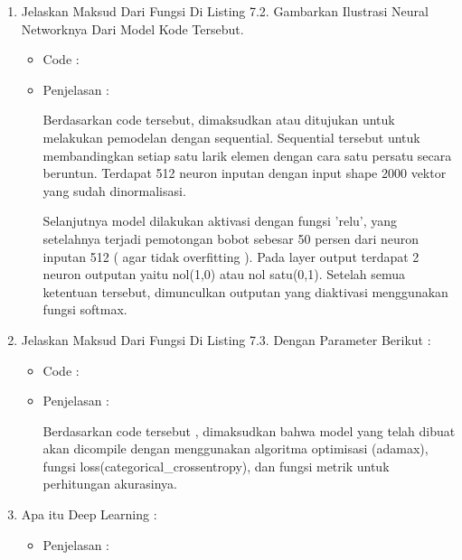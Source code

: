 \begin{enumerate}
\par
\item Jelaskan Maksud Dari Fungsi Di Listing 7.2. Gambarkan Ilustrasi Neural Networknya Dari Model Kode Tersebut.
\begin{itemize}
\item Code :

\item Penjelasan : 
\par Berdasarkan code tersebut, dimaksudkan atau ditujukan untuk melakukan pemodelan dengan sequential. Sequential tersebut untuk membandingkan setiap satu larik elemen dengan cara satu persatu secara beruntun. Terdapat 512 neuron inputan dengan input shape 2000 vektor yang sudah dinormalisasi. 
\par Selanjutnya model dilakukan aktivasi dengan fungsi 'relu', yang setelahnya terjadi pemotongan bobot  sebesar 50 persen dari neuron inputan 512 ( agar tidak overfitting ). Pada layer output terdapat 2 neuron outputan yaitu nol(1,0) atau nol satu(0,1). Setelah semua ketentuan tersebut, dimunculkan outputan yang diaktivasi menggunakan fungsi softmax.
\par
\par
\end{itemize}
\par
\par
\par
\par
\item Jelaskan Maksud Dari Fungsi Di Listing 7.3. Dengan Parameter Berikut :
\begin{itemize}
\item Code :

\item Penjelasan : 
\par Berdasarkan code tersebut , dimaksudkan bahwa model yang telah dibuat akan dicompile dengan menggunakan algoritma optimisasi (adamax), fungsi loss(categorical\_crossentropy), dan fungsi metrik untuk perhitungan akurasinya.
\par
\par
\end{itemize}
\par
\par
\par
\item Apa itu Deep Learning :
\begin{itemize}
\item Penjelasan :

\end{itemize}
\end{enumerate}
